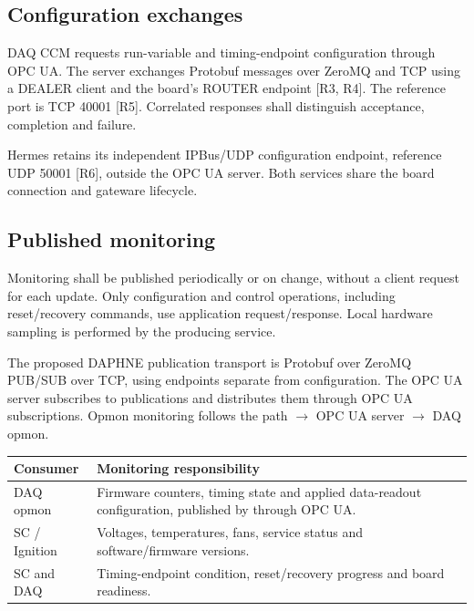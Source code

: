 \subsection{Configuration exchanges}

DAQ CCM requests run-variable and timing-endpoint configuration through OPC UA.
The server exchanges Protobuf
messages over ZeroMQ and TCP using a DEALER client and the board's ROUTER
endpoint [R3, R4].
The reference port is TCP 40001 [R5]. Correlated responses shall distinguish
acceptance, completion and failure.

Hermes retains its independent IPBus/UDP configuration endpoint, reference
UDP 50001 [R6], outside the OPC UA server. Both services share the board
connection and gateware lifecycle.

\subsection{Published monitoring}

Monitoring shall be published periodically or on change, without a client
request for each update. Only configuration and control operations, including
reset/recovery commands, use application request/response. Local hardware
sampling is performed by the producing service.

The proposed DAPHNE publication transport is Protobuf over ZeroMQ PUB/SUB over TCP,
using endpoints separate from configuration. The OPC UA server subscribes to
 publications and distributes them through OPC UA
subscriptions. Opmon monitoring follows the path
 $\rightarrow$ OPC UA server $\rightarrow$ DAQ opmon.

\begin{center}\small
\begin{tabular}{L{0.25\textwidth}L{0.68\textwidth}}
\toprule
\textbf{Consumer} & \textbf{Monitoring responsibility} \\
\midrule
DAQ opmon & Firmware counters, timing state and applied data-readout configuration, published by  through OPC UA. \\
SC / Ignition & Voltages, temperatures, fans, service status and software/firmware versions. \\
SC and DAQ & Timing-endpoint condition, reset/recovery progress and board readiness. \\
\bottomrule
\end{tabular}
\end{center}

